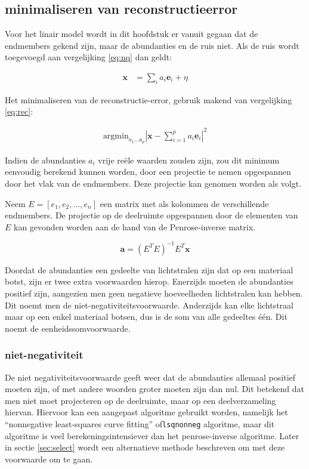 \documentclass[12pt]{report}
\begin{document}
\subsection{minimaliseren van reconstructieerror}
Voor het linair model wordt in dit hoofdstuk er vanuit gegaan dat de endmembers gekend zijn, maar de abundanties en de ruis niet. Als de ruis wordt toegevoegd aan vergelijking \ref{eq:nq} dan geldt:

\begin{align}
\bm{x} &= \sum_i a_i \bm{e}_i + \eta
\end{align}

Het minimaliseren van de reconstructie-error, gebruik makend van vergelijking \ref{eq:rec}:

\begin{align}
\text{argmin}_{a_1 ... a_p} \left| \bm{x} - \sum_{i=1}^p a_i \bm{e}_i\right|^2
\end{align}

Indien de abundanties $a_i$ vrije re\"ele waarden zouden zijn, zou dit minimum eenvoudig berekend kunnen worden, door een projectie te nemen opgespannen door het vlak van de endmembers. Deze projectie kan genomen worden als volgt.

Neem $E = [e_1,e_2,...,e_n]$ een matrix met als kolommen de verschillende endmembers. De projectie op de deelruimte opgespannen door de elementen van $E$ kan gevonden worden aan de hand van de Penrose-inverse matrix.

\begin{equation}
\bm{a} = (E^T E)^{-1} E^T \bm{x}
\end{equation}

Doordat de abundanties een gedeelte van lichtstralen zijn dat op een materiaal botst, zijn er twee extra voorwaarden hierop. Enerzijds moeten de abundanties positief zijn, aangezien men geen negatieve hoeveelheden lichtstralen kan hebben. Dit noemt men de niet-negativiteitsvoorwaarde. Anderzijds kan elke lichtstraal maar op een enkel materiaal botsen, dus is de som van alle gedeeltes \'e\'en. Dit noemt de eenheidssomvoorwaarde.  


\subsubsection{niet-negativiteit}

De niet negativiteitsvoorwaarde geeft weer dat de abundanties allemaal positief moeten zijn, of met andere woorden groter moeten zijn dan nul. Dit betekend dat men niet moet projecteren op de deelruimte, maar op een deelverzameling hiervan. Hiervoor kan een aangepast algoritme gebruikt worden, namelijk het ``nonnegative least-squares curve fitting'' of\texttt{lsqnonneg} algoritme, maar dit algoritme is veel berekeningsintensiever dan het penrose-inverse algoritme. Later in sectie \ref{sec:select} wordt een alternatieve methode beschreven om met deze voorwaarde om te gaan.
\end{document}
